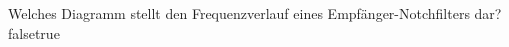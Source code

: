     {Welches Diagramm stellt den Frequenzverlauf eines Empfänger-Notchfilters dar?}
    {}
    {}
    {}
    {}
    {false}{true}